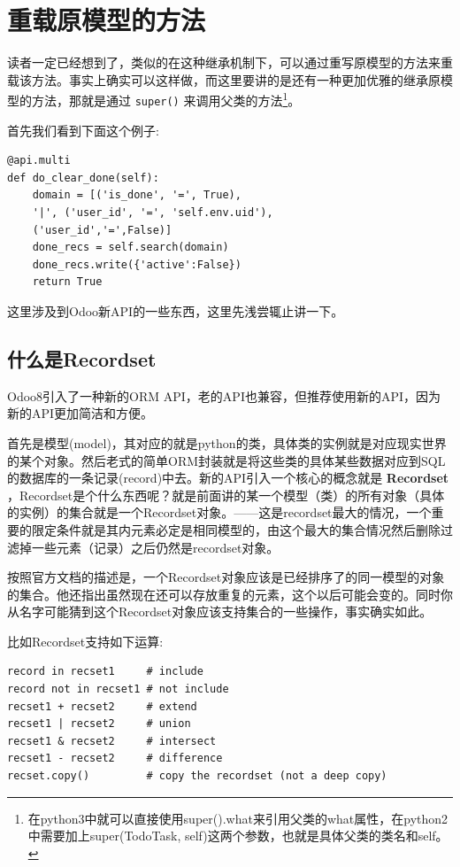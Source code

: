 \documentclass[11pt,a4paper]{sphinxmanual}
\begin{document}
\section{重载原模型的方法}
\label{sec-8-3}
读者一定已经想到了，类似的在这种继承机制下，可以通过重写原模型的方法来重载该方法。事实上确实可以这样做，而这里要讲的是还有一种更加优雅的继承原模型的方法，那就是通过 \verb~super()~ 来调用父类的方法\footnote{在python3中就可以直接使用super().what来引用父类的what属性，在python2中需要加上super(TodoTask, self)这两个参数，也就是具体父类的类名和self。}。

首先我们看到下面这个例子:
\begin{Verbatim}
@api.multi
def do_clear_done(self):
    domain = [('is_done', '=', True),
    '|', ('user_id', '=', 'self.env.uid'),
    ('user_id','=',False)]
    done_recs = self.search(domain)
    done_recs.write({'active':False})
    return True
\end{Verbatim}

这里涉及到Odoo新API的一些东西，这里先浅尝辄止讲一下。



\subsection{什么是Recordset}
\label{sec-8-3-1}
Odoo8引入了一种新的ORM API，老的API也兼容，但推荐使用新的API，因为新的API更加简洁和方便。

首先是模型(model)，其对应的就是python的类，具体类的实例就是对应现实世界的某个对象。然后老式的简单ORM封装就是将这些类的具体某些数据对应到SQL的数据库的一条记录(record)中去。新的API引入一个核心的概念就是 \textbf{Recordset} ，Recordset是个什么东西呢？就是前面讲的某一个模型（类）的所有对象（具体的实例）的集合就是一个Recordset对象。——这是recordset最大的情况，一个重要的限定条件就是其内元素必定是相同模型的，由这个最大的集合情况然后删除过滤掉一些元素（记录）之后仍然是recordset对象。

按照官方文档的描述是，一个Recordset对象应该是已经排序了的同一模型的对象的集合。他还指出虽然现在还可以存放重复的元素，这个以后可能会变的。同时你从名字可能猜到这个Recordset对象应该支持集合的一些操作，事实确实如此。

比如Recordset支持如下运算:
\begin{Verbatim}
record in recset1     # include
record not in recset1 # not include
recset1 + recset2     # extend 
recset1 | recset2     # union
recset1 & recset2     # intersect
recset1 - recset2     # difference
recset.copy()         # copy the recordset (not a deep copy)
\end{Verbatim}
\end{document}
